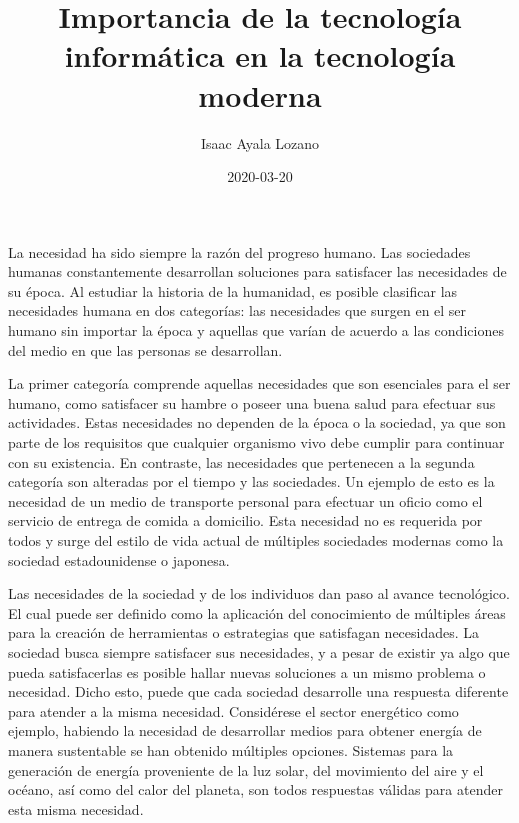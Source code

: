 \documentclass[a4paper,12pt]{article}
\title{Importancia de la tecnología informática en la tecnología moderna}
\author{Isaac Ayala Lozano}
\date{2020-03-20}
\begin{document}
\maketitle

La necesidad ha sido siempre la razón del progreso humano.
Las sociedades humanas constantemente desarrollan soluciones para satisfacer las necesidades de su época.
Al estudiar la historia de la humanidad, es posible clasificar las necesidades humana en dos categorías:
 las necesidades que surgen en el ser humano sin importar la época y aquellas que varían de acuerdo a las condiciones del medio en que las personas se desarrollan.

La primer categoría comprende aquellas necesidades que son esenciales para el ser humano, como satisfacer su hambre o poseer una buena salud para efectuar sus actividades.
Estas necesidades no dependen de la época o la sociedad, ya que son parte de los requisitos que cualquier organismo vivo debe cumplir para continuar con su existencia.
En contraste, las necesidades que pertenecen a la segunda categoría son alteradas por el tiempo y las sociedades.
Un ejemplo de esto es la necesidad de un medio de transporte personal para efectuar un oficio como el servicio de entrega de comida a domicilio.
Esta necesidad no es requerida por todos y surge del estilo de vida actual de múltiples sociedades modernas como la sociedad estadounidense o japonesa.

Las necesidades de la sociedad y de los individuos dan paso al avance tecnológico.
El cual puede ser definido como la aplicación del conocimiento de múltiples áreas para la creación de herramientas o estrategias que satisfagan necesidades.
La sociedad busca siempre satisfacer sus necesidades, y a pesar de existir ya algo que pueda satisfacerlas es posible hallar nuevas soluciones a un mismo problema o necesidad.
Dicho esto, puede que cada sociedad desarrolle una respuesta diferente para atender a la misma necesidad.
Considérese el sector energético como ejemplo, habiendo la necesidad de desarrollar medios para obtener energía de manera sustentable se han obtenido múltiples opciones.
Sistemas para la generación de energía proveniente de la luz solar, del movimiento del aire y el océano, así como del calor del planeta, son todos respuestas válidas para atender esta misma necesidad.
\end{document}
